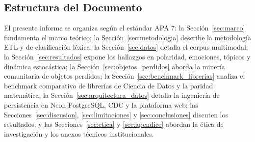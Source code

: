 \subsection{Estructura del Documento}

El presente informe se organiza según el estándar APA 7: la Sección~\ref{sec:marco} fundamenta el marco teórico; la Sección~\ref{sec:metodologia} describe la metodología ETL y de clasificación léxica; la Sección~\ref{sec:datos} detalla el corpus multimodal; la Sección~\ref{sec:resultados} expone los hallazgos en polaridad, emociones, tópicos y dinámica estocástica; la Sección~\ref{sec:objetos_perdidos} aborda la minería comunitaria de objetos perdidos; la Sección~\ref{sec:benchmark_librerias} analiza el benchmark comparativo de librerías de Ciencia de Datos y la paridad matemática; la Sección~\ref{sec:arquitectura_datos} detalla la ingeniería de persistencia en Neon PostgreSQL, CDC y la plataforma web; las Secciones~\ref{sec:discusion}, \ref{sec:limitaciones} y \ref{sec:conclusiones} discuten los resultados; y las Secciones~\ref{sec:etica} y \ref{sec:apendice} abordan la ética de investigación y los anexos técnicos institucionales.
